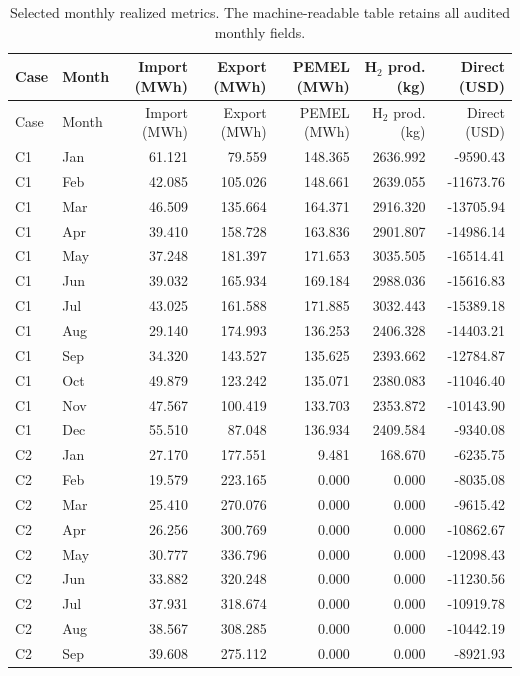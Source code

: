 \begin{longtable}{llrrrrr}
\caption{Selected monthly realized metrics. The machine-readable table retains all audited monthly fields.}\label{tab:s-monthly}\\
\toprule
Case & Month & Import (MWh) & Export (MWh) & PEMEL (MWh) & H$_2$ prod. (kg) & Direct (USD)\\
\midrule
\endfirsthead
\toprule
Case & Month & Import (MWh) & Export (MWh) & PEMEL (MWh) & H$_2$ prod. (kg) & Direct (USD)\\
\midrule
\endhead
C1 & Jan & 61.121 & 79.559 & 148.365 & 2636.992 & -9590.43 \\
C1 & Feb & 42.085 & 105.026 & 148.661 & 2639.055 & -11673.76 \\
C1 & Mar & 46.509 & 135.664 & 164.371 & 2916.320 & -13705.94 \\
C1 & Apr & 39.410 & 158.728 & 163.836 & 2901.807 & -14986.14 \\
C1 & May & 37.248 & 181.397 & 171.653 & 3035.505 & -16514.41 \\
C1 & Jun & 39.032 & 165.934 & 169.184 & 2988.036 & -15616.83 \\
C1 & Jul & 43.025 & 161.588 & 171.885 & 3032.443 & -15389.18 \\
C1 & Aug & 29.140 & 174.993 & 136.253 & 2406.328 & -14403.21 \\
C1 & Sep & 34.320 & 143.527 & 135.625 & 2393.662 & -12784.87 \\
C1 & Oct & 49.879 & 123.242 & 135.071 & 2380.083 & -11046.40 \\
C1 & Nov & 47.567 & 100.419 & 133.703 & 2353.872 & -10143.90 \\
C1 & Dec & 55.510 & 87.048 & 136.934 & 2409.584 & -9340.08 \\
C2 & Jan & 27.170 & 177.551 & 9.481 & 168.670 & -6235.75 \\
C2 & Feb & 19.579 & 223.165 & 0.000 & 0.000 & -8035.08 \\
C2 & Mar & 25.410 & 270.076 & 0.000 & 0.000 & -9615.42 \\
C2 & Apr & 26.256 & 300.769 & 0.000 & 0.000 & -10862.67 \\
C2 & May & 30.777 & 336.796 & 0.000 & 0.000 & -12098.43 \\
C2 & Jun & 33.882 & 320.248 & 0.000 & 0.000 & -11230.56 \\
C2 & Jul & 37.931 & 318.674 & 0.000 & 0.000 & -10919.78 \\
C2 & Aug & 38.567 & 308.285 & 0.000 & 0.000 & -10442.19 \\
C2 & Sep & 39.608 & 275.112 & 0.000 & 0.000 & -8921.93 \\

\end{longtable}
